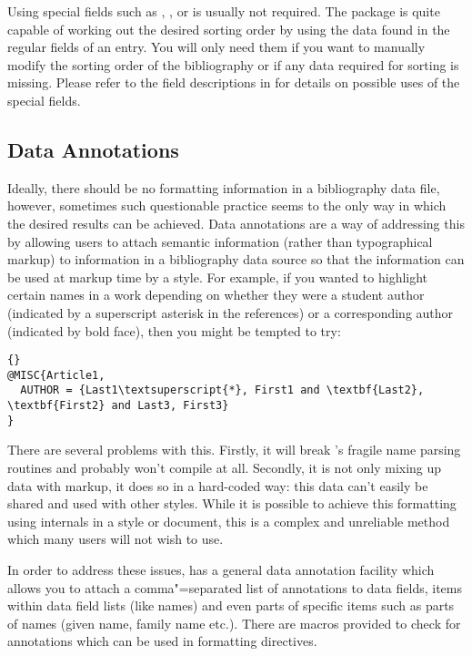 \documentclass{ltxdockit}[2011/03/25]
\newcommand*{\biblatex}{\sty{biblatex}\xspace}
\begin{document}
Using special fields such as , , or  is usually not required. The \biblatex package is quite capable of working out the desired sorting order by using the data found in the regular fields of an entry. You will only need them if you want to manually modify the sorting order of the bibliography or if any data required for sorting is missing. Please refer to the field descriptions in  for details on possible uses of the special fields.

\subsection{Data Annotations}
\label{use:annote}
Ideally, there should be no formatting information in a bibliography data file, however, sometimes such questionable practice seems to the only way in which the desired results can be achieved. Data annotations are a way of addressing this by allowing users to attach semantic information (rather than typographical markup) to information in a bibliography data source so that the information can be used at markup time by a style. For example, if you wanted to highlight certain names in a work depending on whether they were a student author (indicated by a superscript asterisk in the references) or a corresponding author (indicated by bold face), then you might be tempted to try:

\begin{lstlisting}[style=bibtex]{}
@MISC{Article1,
  AUTHOR = {Last1\textsuperscript{*}, First1 and \textbf{Last2}, \textbf{First2} and Last3, First3}
}
\end{lstlisting}
%
There are several problems with this. Firstly, it will break \bibtex's fragile name parsing routines and probably won't compile at all. Secondly, it is not only mixing up data with markup, it does so in a hard-coded way: this data can't easily be shared and used with other styles. While it is possible to achieve this formatting using \biblatex internals in a style or document, this is a complex and unreliable method which many users will not wish to use.

In order to address these issues, \biblatex has a general data annotation facility which allows you to attach a comma"=separated list of annotations to data fields, items within data field lists (like names) and even parts of specific items such as parts of names (given name, family name etc.). There are macros provided to check for annotations which can be used in formatting directives.
\end{document}
